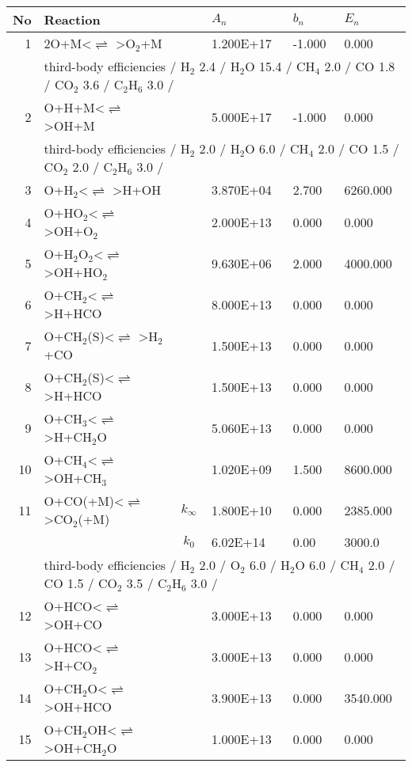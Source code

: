 \documentclass[11pt]{article}
\begin{document}
\begin{table}[hbt]
\begin{tabular}{|r l c l l l|} \hline 
No& Reaction &   & $A_n$& $b_n$ & $E_n$\\ \hline 
1 &	2O+M<$\rightleftharpoons$ >O$_{2}$+M&	&	1.200E+17&	-1.000&	0.000\\ 
	&\multicolumn{5}{l|}{third-body efficiencies  / H$_{2}$ 2.4 / H$_{2}$O 15.4 / CH$_{4}$ 2.0 / CO 1.8 / CO$_{2}$ 3.6 / C$_{2}$H$_{6}$ 3.0 /}\\ 
2 &	O+H+M<$\rightleftharpoons$ >OH+M&	&	5.000E+17&	-1.000&	0.000\\ 
	&\multicolumn{5}{l|}{third-body efficiencies  / H$_{2}$ 2.0 / H$_{2}$O 6.0 / CH$_{4}$ 2.0 / CO 1.5 / CO$_{2}$ 2.0 / C$_{2}$H$_{6}$ 3.0 /}\\ 
3 &	O+H$_{2}$<$\rightleftharpoons$ >H+OH&	&	3.870E+04&	2.700&	6260.000\\ 
4 &	O+HO$_{2}$<$\rightleftharpoons$ >OH+O$_{2}$&	&	2.000E+13&	0.000&	0.000\\ 
5 &	O+H$_{2}$O$_{2}$<$\rightleftharpoons$ >OH+HO$_{2}$&	&	9.630E+06&	2.000&	4000.000\\ 
6 &	O+CH$_{2}$<$\rightleftharpoons$ >H+HCO&	&	8.000E+13&	0.000&	0.000\\ 
7 &	O+CH$_{2}$(S)<$\rightleftharpoons$ >H$_{2}$+CO&	&	1.500E+13&	0.000&	0.000\\ 
8 &	O+CH$_{2}$(S)<$\rightleftharpoons$ >H+HCO&	&	1.500E+13&	0.000&	0.000\\ 
9 &	O+CH$_{3}$<$\rightleftharpoons$ >H+CH$_{2}$O&	&	5.060E+13&	0.000&	0.000\\ 
10 &	O+CH$_{4}$<$\rightleftharpoons$ >OH+CH$_{3}$&	&	1.020E+09&	1.500&	8600.000\\ 
11 &	O+CO(+M)<$\rightleftharpoons$ >CO$_{2}$(+M)&	$k_{\infty}$&	1.800E+10&	0.000&	2385.000\\ 
	&	&	$k_0$&	6.02E+14& 0.00&	 3000.0\\ 
	&\multicolumn{5}{l|}{third-body efficiencies  / H$_{2}$ 2.0 / O$_{2}$ 6.0 / H$_{2}$O 6.0 / CH$_{4}$ 2.0 / CO 1.5 / CO$_{2}$ 3.5 / C$_{2}$H$_{6}$ 3.0 /}\\ 
12 &	O+HCO<$\rightleftharpoons$ >OH+CO&	&	3.000E+13&	0.000&	0.000\\ 
13 &	O+HCO<$\rightleftharpoons$ >H+CO$_{2}$&	&	3.000E+13&	0.000&	0.000\\ 
14 &	O+CH$_{2}$O<$\rightleftharpoons$ >OH+HCO&	&	3.900E+13&	0.000&	3540.000\\ 
15 &	O+CH$_{2}$OH<$\rightleftharpoons$ >OH+CH$_{2}$O&	&	1.000E+13&	0.000&	0.000\\ 

\end{tabular}
\end{table}
\end{document}
